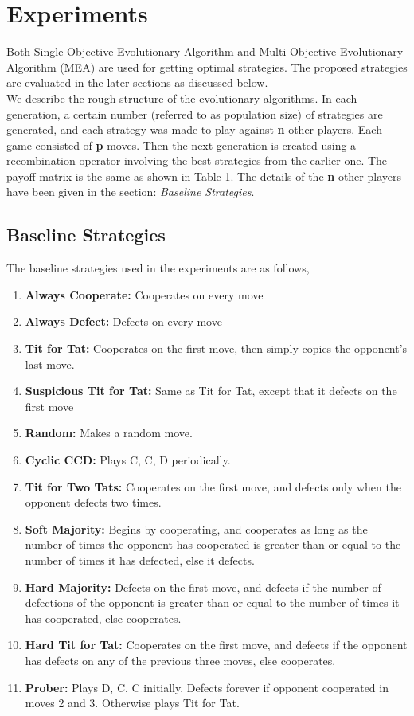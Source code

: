 \documentclass[a4paper]{article}
\begin{document}
	\section{Experiments}
	
	Both Single Objective Evolutionary Algorithm and Multi Objective Evolutionary Algorithm (MEA) are used for getting optimal strategies. The proposed strategies are evaluated in the later sections as discussed below.\\
	We describe the rough structure of the evolutionary algorithms. In each generation, a certain number (referred to as population size) of strategies are generated, and each strategy was made to play against \textbf{n} other players. Each game consisted of \textbf{p} moves. Then the next generation is created using a recombination operator involving the best strategies from the earlier one. The payoff matrix is the same as shown in Table 1. The details of the \textbf{n} other players have been given in the section: \textit{Baseline Strategies}.

	\subsection{Baseline Strategies}
	
	The baseline strategies used in the experiments are as follows,
	\begin{enumerate}
	
	\item \textbf{Always Cooperate:} Cooperates on every move
	\item \textbf{Always Defect:} Defects on every move
	\item \textbf{Tit for Tat:} Cooperates on the first move, then simply copies the opponent's last move.
	\item \textbf{Suspicious Tit for Tat:} Same as Tit for Tat, except that it defects on the first move
	\item \textbf{Random:} Makes a random move.
	\item \textbf{Cyclic CCD:} Plays C, C, D periodically.
	\item \textbf{Tit for Two Tats:} Cooperates on the first move, and defects only when the opponent defects two times.
	\item \textbf{Soft Majority:} Begins by cooperating, and cooperates as long as the number of times the opponent has
cooperated is greater than or equal to the number of times it has defected, else it defects.
	\item \textbf{Hard Majority:} Defects on the first move, and defects if the number of defections of the opponent is greater than or equal to the number of times it has cooperated, else cooperates.
	\item \textbf{Hard Tit for Tat:} Cooperates on the first move, and defects if the opponent has defects on any of the previous three moves, else cooperates.
	\item \textbf{Prober:} Plays D, C, C initially. Defects forever if opponent cooperated in moves 2 and 3. Otherwise plays Tit for Tat.	
	\end{enumerate}
	
\end{document}
